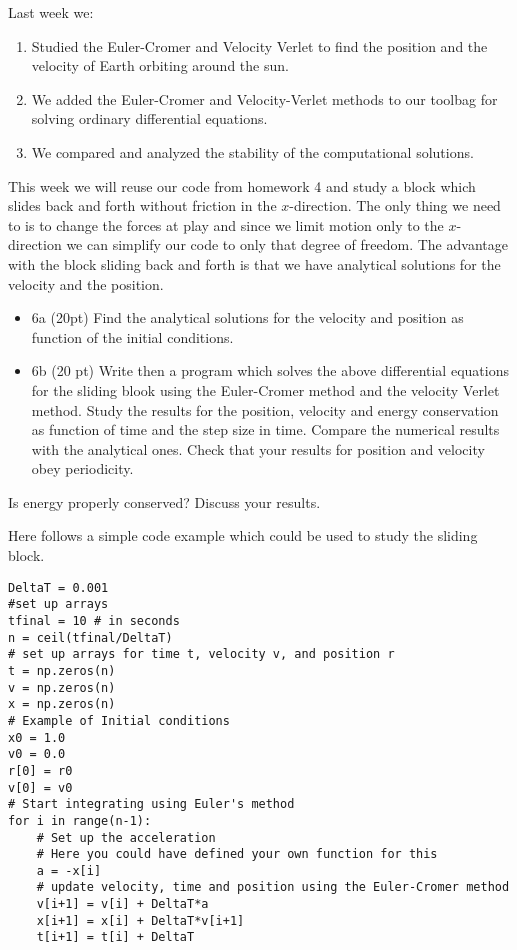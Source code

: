 \documentclass[%
oneside,                 %
final,                   %
10pt]{article}
\begin{document}
Last week we:
\begin{enumerate}
\item Studied  the Euler-Cromer and Velocity Verlet  to find the position and the velocity of  Earth orbiting around the sun.

\item We added the Euler-Cromer and Velocity-Verlet methods to our toolbag for solving ordinary differential equations.

\item We compared and analyzed the stability of the  computational solutions.
\end{enumerate}

\noindent
This week we will reuse our code from homework 4 and study a block
which slides back and forth without friction in the $x$-direction.
The only thing we need to is to change the forces at play and since we
limit motion only to the $x$-direction we can simplify our code to
only that degree of freedom.
The advantage with the block sliding back and forth is that we have analytical solutions for the velocity and the position. 


\begin{itemize}
\item 6a (20pt) Find the analytical solutions for the velocity and position as function of the initial conditions. 

\item 6b (20 pt)  Write then a program which solves the above differential equations for the sliding blook using the Euler-Cromer  method and the velocity Verlet method. Study the results for the position, velocity and energy conservation as function of time and the step size in time. Compare the numerical results with the analytical ones. Check that your results for position and velocity obey periodicity. 
\end{itemize}

\noindent
Is energy properly conserved? Discuss your results. 

Here follows a simple code example which could be used to study the sliding block.
\begin{verbatim}
DeltaT = 0.001
#set up arrays 
tfinal = 10 # in seconds
n = ceil(tfinal/DeltaT)
# set up arrays for time t, velocity v, and position r
t = np.zeros(n)
v = np.zeros(n)
x = np.zeros(n)
# Example of Initial conditions
x0 = 1.0
v0 = 0.0
r[0] = r0
v[0] = v0
# Start integrating using Euler's method
for i in range(n-1):
    # Set up the acceleration
    # Here you could have defined your own function for this
    a = -x[i]
    # update velocity, time and position using the Euler-Cromer method
    v[i+1] = v[i] + DeltaT*a
    x[i+1] = x[i] + DeltaT*v[i+1]
    t[i+1] = t[i] + DeltaT
\end{verbatim}
\end{document}
